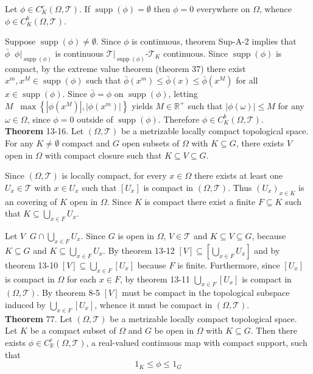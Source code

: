 \documentclass[a4paper]{article}
\newcommand{\obj}[1]{\left\{ #1 \right \}}
\newcommand{\clo}[1]{\left [ #1 \right ]}
\newcommand{\brac}[1]{\left ( #1 \right )}
\newcommand{\induc}[1]{\left . #1 \right \vert}
\newcommand{\abs}[1]{\left | #1 \right |}
\newcommand{\Real}{\mathbb{R}}
\newcommand{\Tcal}{\mathcal{T}}
\newcommand{\Supp}[1]{\operatorname{supp}\nolimits\brac{#1}}
\newcommand{\defn}{\mathop{\overset{\Delta}{=}}\nolimits}
\begin{document}
Let $\phi\in C^c_K\brac{\Omega,\Tcal}$. If $\Supp{\phi}=\emptyset$ then $\phi = 0$ everywhere on $\Omega$, whence $\phi\in C^b_K\brac{\Omega,\Tcal}$.

Suppose $\Supp{\phi}\neq\emptyset$. Since $\phi$ is continuous, theorem Sup-A-2 implies that $\bar{\phi}\defn \induc{\phi}_{\Supp{\phi}}$ is continuous $\induc{\Tcal}_{\Supp{\phi}}$-$\Tcal_K$ continuous. Since $\Supp{\phi}$ is compact, by the extreme value theorem (theorem 37) there exist $x^m,x^M\in \Supp{\phi}$ such that $\bar{\phi}\brac{x^m}\leq \bar{\phi}\brac{x}\leq \bar{\phi}\brac{x^M}$ for all $x\in \Supp{\phi}$. Since $\bar{\phi}=\phi$ on $\Supp{\phi}$, letting $M\defn \max\obj{\abs{\phi\brac{x^M}},\abs{\phi\brac{x^m}}}$ yields $M\in \Real^+$ such that $\abs{\phi\brac{\omega}}\leq M$ for any $\omega\in\Omega$, since $\phi = 0$ outside of $\Supp{\phi}$. Therefore $\phi\in C^b_K\brac{\Omega,\Tcal}$.\\

\label{thm:loc_compact_closure}\noindent\textbf{Theorem} 13-16.
Let $\brac{\Omega,\Tcal}$ be a metrizable locally compact topological space. For any $K\neq \emptyset$ compact and $G$ open subsets of $\Omega$ with $K\subseteq G$, there exists $V$ open in $\Omega$ with compact closure such that $K\subseteq V\subseteq G$.

Since $\brac{\Omega, \Tcal}$ is locally compact, for every $x\in \Omega$ there exists at least one $U_x\in \Tcal$ with $x\in U_x$ such that $\clo{U_x}$ is compact in $\brac{\Omega,\Tcal}$. Thus $\brac{U_x}_{x\in K}$ is an covering of $K$ open in $\Omega$. Since $K$ is compact there exist a finite $F\subseteq K$ such that $K\subseteq \bigcup_{x\in F} U_x$.

Let $V\defn G\cap \bigcup_{x\in F} U_x$. Since $G$ is open in $\Omega$, $V\in \Tcal$ and $K\subseteq V\subseteq G$, because $K\subseteq G$ and $K\subseteq  \bigcup_{x\in F} U_x$. By theorem 13-12 $\clo{V}\subseteq \clo{\bigcup_{x\in F} U_x}$ and by theorem 13-10 $\clo{V} \subseteq \bigcup_{x\in F} \clo{U_x}$ because $F$ is finite. Furthermore, since $\clo{U_x}$ is compact in $\Omega$ for each $x\in F$, by theorem 13-11 $\bigcup_{x\in F} \clo{U_x}$ is compact in $\brac{\Omega,\Tcal}$. By theorem 8-5 $\clo{V}$ must be compact in the topological subspace induced by $\bigcup_{x\in F} \clo{U_x}$, whence it must be compact in $\brac{\Omega,\Tcal}$.\\

\label{thm:compact_support_map}\noindent\textbf{Theorem} 77.
Let $\brac{\Omega,\Tcal}$ be a metrizable locally compact topological space. Let $K$ be a compact subset of $\Omega$ and $G$ be open in $\Omega$ with $K\subseteq G$. Then there exists $\phi\in C^c_\Real\brac{\Omega,\Tcal}$,  a real-valued continuous map with compact support, such that \[1_K\leq \phi \leq 1_G\]
\end{document}
